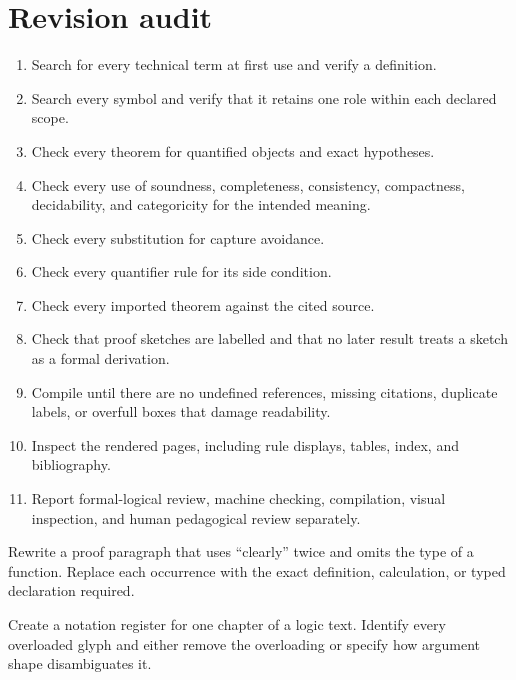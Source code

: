 \section{Revision audit}
\label{sec:latex-style-06}

\begin{method}
\begin{enumerate}
  \item Search for every technical term at first use and verify a definition.
  \item Search every symbol and verify that it retains one role within each
        declared scope.
  \item Check every theorem for quantified objects and exact hypotheses.
  \item Check every use of soundness, completeness, consistency, compactness,
        decidability, and categoricity for the intended meaning.
  \item Check every substitution for capture avoidance.
  \item Check every quantifier rule for its side condition.
  \item Check every imported theorem against the cited source.
  \item Check that proof sketches are labelled and that no later result treats a
        sketch as a formal derivation.
  \item Compile until there are no undefined references, missing citations,
        duplicate labels, or overfull boxes that damage readability.
  \item Inspect the rendered pages, including rule displays, tables, index, and
        bibliography.
  \item Report formal-logical review, machine checking, compilation, visual
        inspection, and human pedagogical review separately.
\end{enumerate}
\end{method}

\begin{exercise}
\label{ex:latex-style-01}
Rewrite a proof paragraph that uses ``clearly'' twice and omits the type of a
function.  Replace each occurrence with the exact definition, calculation, or
typed declaration required.
\end{exercise}

\begin{exercise}
\label{ex:latex-style-02}
Create a notation register for one chapter of a logic text.  Identify every
overloaded glyph and either remove the overloading or specify how argument
shape disambiguates it.
\end{exercise}

